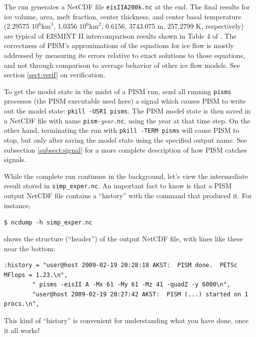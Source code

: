\documentclass[11pt,final]{amsart}
\begin{document}
The run generates a NetCDF file \verb|eisIIA200k.nc| at the end.  The final results for ice volume, area, melt fraction, center thickness, and center basal temperature (2.29575 $10^6 \text{km}^3$, 1.0356 $10^6 \text{km}^2$, 0.6156, 3743.075 m, 257.2799 K, respectively) are typical of EISMINT II intercomparison results shown in Table 4 of \cite{EISMINT00}.  The correctness of PISM's approximations of the equations for ice flow is mostly addressed by measuring its errors relative to exact solutions to those equations, and not through comparison to average behavior of other ice flow models.  See section \ref{sect:verif} on verification.

To get the model state in the midst of a PISM run, send all running \verb|pisms| processes (the PISM executable used here) a signal which causes PISM to write out the model state: \verb|pkill -USR1 pisms|.  The PISM model state is then saved in a NetCDF file with name \verb|pism-|\emph{year}\verb|.nc|, using the year at that time step.  On the other hand, terminating the run with \verb|pkill -TERM pisms| will cause PISM to stop, but only after saving the model state using the specified output name.  See subsection \ref{subsect:signal} for a more complete description of how PISM catches signals.

While the complete run continues in the background, let's view the intermediate result stored in \verb|simp_exper.nc|.  An important fact to know is that a PISM output NetCDF file contains a ``history'' with the command that produced it.  For instance, 

\verb|$ ncdump -h simp_exper.nc|

\noindent shows the structure (``header'') of the output NetCDF file, with lines like these near the bottom:
\small
\begin{verbatim}
:history = "user@host 2009-02-19 20:28:18 AKST:  PISM done.  PETSc MFlops = 1.23.\n",
        " pisms -eisII A -Mx 61 -My 61 -Mz 41 -quadZ -y 6000\n",
        "user@host 2009-02-19 20:27:42 AKST:  PISM (...) started on 1 procs.\n",
\end{verbatim}
\normalsize
\noindent This kind of ``history'' is convenient for understanding what you have done, once it all works!
\end{document}
